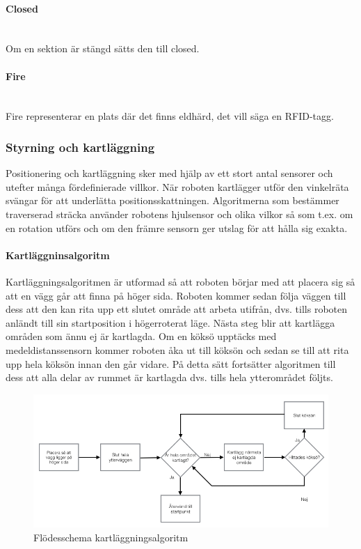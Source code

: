 \documentclass[a4paper,12pt,fleqn]{article}
\begin{document}
\paragraph{Closed} 
~\\
Om en sektion är stängd sätts den till closed.

\paragraph{Fire} 
~\\
Fire representerar en plats där det finns eldhärd, det vill säga en RFID-tagg. 
\newpage

\subsubsection{Styrning och kartläggning}
Positionering och kartläggning sker med hjälp av ett stort antal sensorer och utefter många fördefinierade villkor. När roboten kartlägger utför den vinkelräta svängar för att underlätta positionsskattningen. Algoritmerna som bestämmer traverserad sträcka använder robotens hjulsensor och olika vilkor så som t.ex.  om en rotation utförs och om den främre sensorn ger utslag för att hålla sig exakta. 

\paragraph{Kartläggninsalgoritm}

Kartläggningsalgoritmen är utformad så att roboten börjar med att placera sig så att en vägg går att finna på höger sida. Roboten kommer sedan följa väggen till dess att den kan rita upp ett slutet område att arbeta utifrån, dvs. tills roboten anländt till sin startposition i högerroterat läge. Nästa steg blir att kartlägga områden som ännu ej är kartlagda. Om en köksö upptäcks med medeldistanssensorn kommer roboten åka ut till köksön och sedan se till att rita upp hela köksön innan den går vidare. På detta sätt fortsätter algoritmen till dess att alla delar av rummet är kartlagda dvs. tills hela ytterområdet följts. 

\begin{figure}[htp] %
  \begin{center}
  \includegraphics[keepaspectratio=true,width=0.8\linewidth]{bilder/Flode_kartritning.jpg}  %
  \end{center}
  \caption{Flödesschema kartläggningsalgoritm} %
  \label{fig:map} %
\end{figure}
\end{document}

